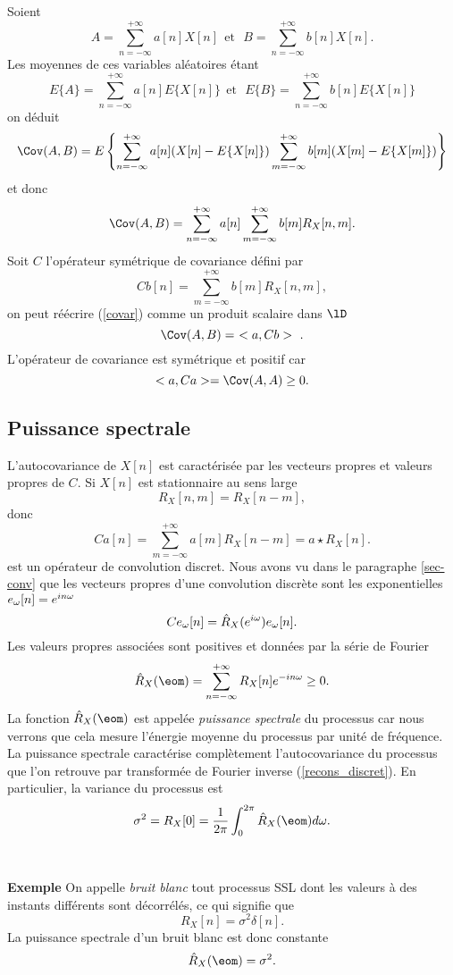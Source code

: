 Soient
\[
A = \sum_{n=-\infty}^{+\infty} a[n] X[n] ~~\mbox{et}~~~
B = \sum_{n=-\infty}^{+\infty} b[n] X[n] .
\]
Les moyennes de ces variables al\'eatoires \'etant
\[
E\{A\} = \sum_{n=-\infty}^{+\infty} a[n] E\{X[n]\}  
~~\mbox{et}~~~
E\{B\} = \sum_{n=-\infty}^{+\infty} b[n] E\{X[n]\}  
\]
on d\'eduit 
\[
\Cov(A,B)  = 
E \left\{ \sum_{n=-\infty}^{+\infty} a[n] (X[n] - E\{X[n]\}) 
\sum_{m=-\infty}^{+\infty} b[m] (X[m] - E\{X[m]\}) 
\right\}  
\]
et donc
\begin{equation}
\label{covar}
\Cov(A,B)  = 
\sum_{n=-\infty}^{+\infty} 
a[n] \sum_{m=-\infty}^{+\infty} b[m] R_X [n,m] .
\end{equation}
Soit $C$ l'op\'erateur sym\'etrique de covariance d\'efini par
\begin{equation}
\label{cov}
Cb[n] = \sum_{m=-\infty}^{+\infty} b[m] R_X [n,m] ,
\end{equation}
on peut r\'e\'ecrire (\ref{covar}) 
comme un produit scalaire dans $\lD$
\[
\Cov(A,B) = ~< a , Cb >~.
\]
L'op\'erateur de covariance est sym\'etrique et positif car
\[
<a,Ca> = \Cov(A,A) \geq 0 . 
\]


\subsection{Puissance spectrale}

L'autocovariance de $X[n]$ est caract\'eris\'ee
par les vecteurs propres et valeurs propres de $C$.
Si $X[n]$ est stationnaire au sens large 
\[
R_X [n,m] = R_X [n-m], 
\]
donc
\[
Ca[n] = \sum_{m=-\infty}^{+\infty} a[m] R_X[n-m] = a \star R_X [n] .
\]
est un op\'erateur de convolution discret.
Nous avons vu dans
le paragraphe \ref{sec-conv} que les vecteurs propres d'une
convolution discr\`ete sont les exponentielles
$e_{\omega} [n] = {e ^{i n\omega}}$ 
\[
C e_{\omega} [n] = \hat R_X (e^{i {\omega}}) e_{\omega} [n] .
\]
Les valeurs propres associ\'ees sont positives et donn\'ees
par la s\'erie de Fourier
\[
\hat R_X(\eom) = \sum_{n=-\infty}^{+\infty} R_X[n] \emnom  \geq 0 .
\]
La fonction $\hat R_X(\eom)$ est appel\'ee 
{\it puissance spectrale} du processus car nous verrons que
cela mesure l'\'energie moyenne du processus par unit\'e de
fr\'equence. 
La puissance spectrale caract\'erise compl\`etement
l'autocovariance du processus que l'on retrouve par
transform\'ee de Fourier inverse (\ref{recons_discret}). 
En particulier, 
la variance du processus est
\[
\sigma^2 = 
R_X[0] = \frac 1 {2 \pi} \int_{0}^{2 \pi} \hat R_X(\eom) d \om .
\]
\\
\\
{\bf Exemple}
On appelle {\em bruit blanc} tout processus SSL dont les
valeurs \`a des instants diff\'erents sont d\'ecorr\'el\'es,
ce qui signifie que
\[
R_X[n] = \sigma^2 \delta [n] .
\]
La puissance spectrale d'un bruit blanc est donc constante
\[
\hat R_X(\eom) = \sigma^2 .
\]

